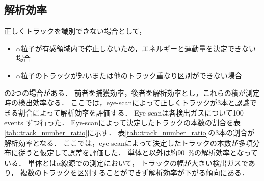 \documentclass[../master]{subfiles}
\begin{document}
\subsection{解析効率}
正しくトラックを識別できない場合として，
\begin{itemize}
\item 
  $\alpha$粒子が有感領域内で停止しないため，エネルギーと運動量を決定できない場合
\item
  $\alpha$粒子のトラックが短いまたは他のトラック重なり区別ができない場合
\end{itemize}
の2つの場合がある．
前者を捕獲効率，後者を解析効率とし，これらの積が測定時の検出効率なる．
ここでは，eye-scanによって正しくトラックが3本と認識できる割合によって解析効率を評価する．
Eye-scanは各検出ガスについて100 events ずつ行った．
Eye-scanによって決定したトラックの本数の割合を表\ref{tab::track_number_ratio}に示す．
表\ref{tab::track_number_ratio}の3本の割合が解析効率となる．
ここでは，eye-scanによって決定したトラックの本数が多項分布に従うと仮定して誤差を評価した．
\Methane 単体と\MethaneHerium 以外は約\SI{90}{\percent}の解析効率となっている．
\Methane 単体と\MethaneHerium は$\alpha$線源での測定において，
トラックの幅が大きい検出ガスであり，
複数のトラックを区別することができず解析効率が下がる傾向にある．
\end{document}

